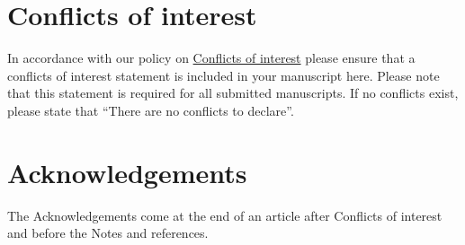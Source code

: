 \documentclass[twoside,twocolumn,9pt]{article}
\begin{document}
\section*{Conflicts of interest}
In accordance with our policy on
\href{http://www.rsc.org/journals-books-databases/journal-authors-reviewers/author-responsibilities/#code-of-conduct}{Conflicts
of interest} please ensure that a conflicts of interest statement is
included in your manuscript here.  Please note that this statement is
required for all submitted manuscripts.  If no conflicts exist, please
state that ``There are no conflicts to declare''.

\section*{Acknowledgements}
The Acknowledgements come at the end of an article after Conflicts of interest and before the Notes and references.



\balance

\end{document}
